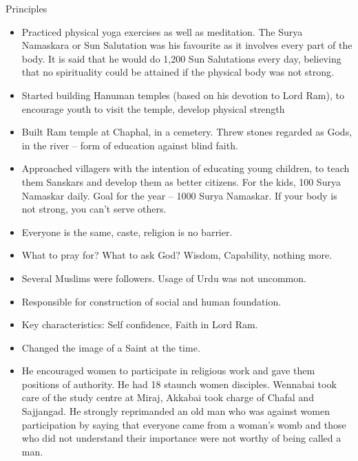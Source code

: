 Principles
\begin{itemize}[noitemsep,nolistsep]
\item Practiced physical yoga exercises as well as meditation. The Surya Namaskara or Sun Salutation was his favourite as it involves every part of the body. It is said that he would do 1,200 Sun Salutations every day, believing that no spirituality could be attained if the physical body was not strong.
\item  Started building Hanuman temples (based on his devotion to Lord Ram), to encourage youth to visit the temple, develop physical strength
\item Built Ram temple at Chaphal, in a cemetery. Threw stones regarded as Gods, in the river – form of education against blind faith.
\item Approached villagers with the intention of educating young children, to teach them Sanskars and develop them as better citizens. For the kids, 100 Surya Namaskar daily. Goal for the year – 1000 Surya Namaskar. If your body is not strong, you can't serve others.
\item Everyone is the same, caste, religion is no barrier.
\item What to pray for? What to ask God? Wisdom, Capability, nothing more.
\item Several Muslims were followers. Usage of Urdu was not uncommon.
\item Responsible for construction of social and human foundation.
\item Key characteristics: Self confidence, Faith in Lord Ram.
\item Changed the image of a Saint at the time.
\item  He encouraged women to participate in religious work and gave them positions of authority. He had 18 staunch women disciples. Wennabai took care of the study centre at Miraj, Akkabai took charge of Chafal and Sajjangad. He strongly reprimanded an old man who was against women participation by saying that everyone came from a woman’s womb and those who did not understand their importance were not worthy of being called a man. 
\end{itemize}


